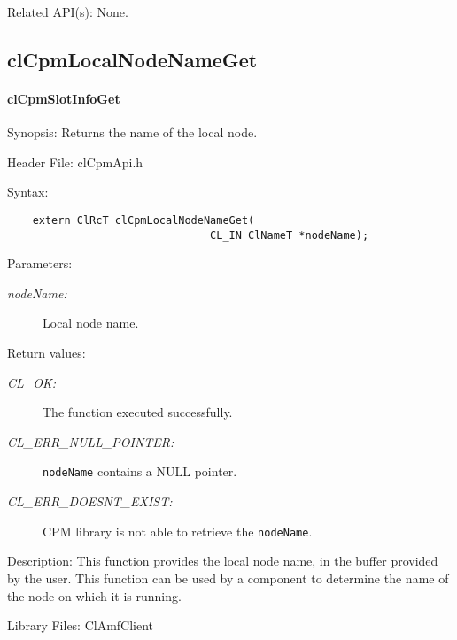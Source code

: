 {\begin{Desc}
\item[Related API(s):]None. \end{Desc}
\newpage





\subsection{clCpmLocalNodeNameGet}
\hypertarget{pageCPM138}{}\paragraph{cl\-Cpm\-Slot\-Info\-Get}\label{pageCPM138}
\begin{Desc}
\item[Synopsis:]Returns the name of the local node.\end{Desc}
\begin{Desc}
\item[Header File:]clCpmApi.h\end{Desc}
\begin{Desc}
\item[Syntax:]

\footnotesize\begin{verbatim}    extern ClRcT clCpmLocalNodeNameGet(
                      			CL_IN ClNameT *nodeName);
\end{verbatim}
\normalsize
\end{Desc}
\begin{Desc}
\item[Parameters:]
\begin{description}
\item[{\em node\-Name:}]Local node name.\end{description}
\end{Desc}
\begin{Desc}
\item[Return values:]
\begin{description}
\item[{\em CL\_\-OK:}]The function executed successfully. 
\item[{\em CL\_\-ERR\_\-NULL\_\-POINTER:}]{\tt{nodeName}} contains a NULL pointer.
\item[{\em CL\_\-ERR\_\-DOESNT\_\-EXIST:}]CPM library is not able to retrieve the {\tt{node\-Name}}.\end{description}
\end{Desc}
\begin{Desc}
\item[Description:]This function provides the local node name, in the buffer provided by the user. This function can be used by a component to determine 
the name of the node on which it is running.\end{Desc}
\begin{Desc}
\item[Library Files:]Cl\-Amf\-Client\end{Desc}

}
